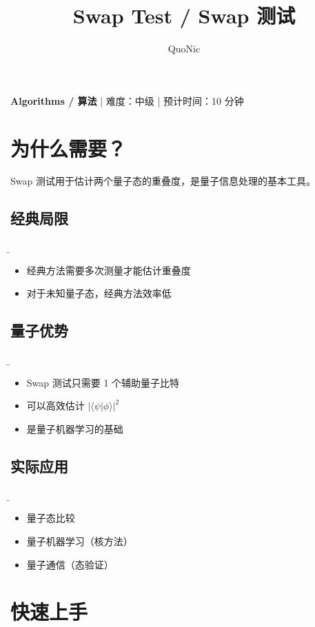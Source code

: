 \documentclass[12pt,a4paper]{article}
\title{Swap Test / Swap 测试}
\author{QuoNic}
\date{}
\begin{document}
\maketitle

\begin{center}
\textbf{Algorithms / 算法} | 难度：中级 | 预计时间：10 分钟
\end{center}

\tableofcontents
\newpage

\section{为什么需要？}

Swap 测试用于估计两个量子态的重叠度，是量子信息处理的基本工具。

\subsection{经典局限}
\b\begin{itemize}
  \item 经典方法需要多次测量才能估计重叠度
  \item 对于未知量子态，经典方法效率低
\end{itemize}

\subsection{量子优势}
\b\begin{itemize}
  \item Swap 测试只需要 1 个辅助量子比特
  \item 可以高效估计 $|\langle\psi|\phi\rangle|^2$
  \item 是量子机器学习的基础
\end{itemize}

\subsection{实际应用}
\b\begin{itemize}
  \item 量子态比较
  \item 量子机器学习（核方法）
  \item 量子通信（态验证）
\end{itemize}

\section{快速上手}
\end{document}
